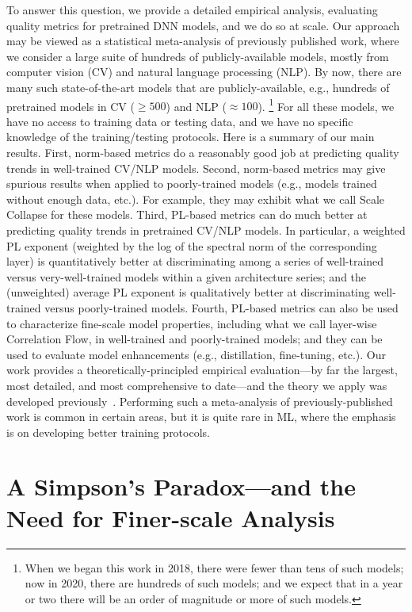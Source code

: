 \documentclass{article}
\begin{document}
To answer this question, we provide a detailed empirical analysis, evaluating quality metrics for pretrained DNN models, and we do so at scale.
Our approach may be viewed as a statistical meta-analysis of previously published work, where we consider a large suite of hundreds of publicly-available models, mostly from computer vision (CV) and natural language processing (NLP).
By now, there are many such state-of-the-art models that are publicly-available, e.g., 
hundreds of pretrained models in CV ($\ge 500$) and NLP ($\approx 100$).%
\footnote{When we began this work in 2018, there were fewer than tens of such models; now in 2020, there are hundreds of such models; and we expect that in a year or two there will be an order of magnitude or more of such models.}
For all these models, we have no access to training data or testing data, and we have no specific knowledge of the training/testing protocols. 
%
Here is a summary of our main results.
First, norm-based metrics do a reasonably good job at predicting quality trends in well-trained CV/NLP models.
Second, norm-based metrics may give spurious results when applied to poorly-trained models (e.g., models trained without enough data, etc.).
For example, they may exhibit what we call Scale Collapse for these models. 
Third, PL-based metrics can do much better at predicting quality trends in pretrained CV/NLP models.  
In particular, 
a weighted PL exponent (weighted by the log of the spectral norm of the corresponding layer) is 
quantitatively better at discriminating among a series of well-trained versus very-well-trained models
within a given architecture series; and
the (unweighted) average PL exponent is 
qualitatively better at discriminating well-trained versus poorly-trained models.
Fourth, PL-based metrics can also be used to characterize fine-scale model properties, including what we call layer-wise Correlation Flow, in well-trained and poorly-trained models; and they can be used to evaluate model enhancements (e.g., distillation, fine-tuning, etc.).
%
Our work provides a theoretically-principled empirical evaluation---by far the largest, most detailed, and most comprehensive to date---and the theory we apply was developed previously~\cite{MM18_TR, MM19_HTSR_ICML, MM20_SDM}.
Performing such a meta-analysis of previously-published work is common in certain areas, but it is quite rare in ML, where the emphasis is on developing better training protocols.



\section{A Simpson's Paradox---and the Need for Finer-scale Analysis}
\end{document}
